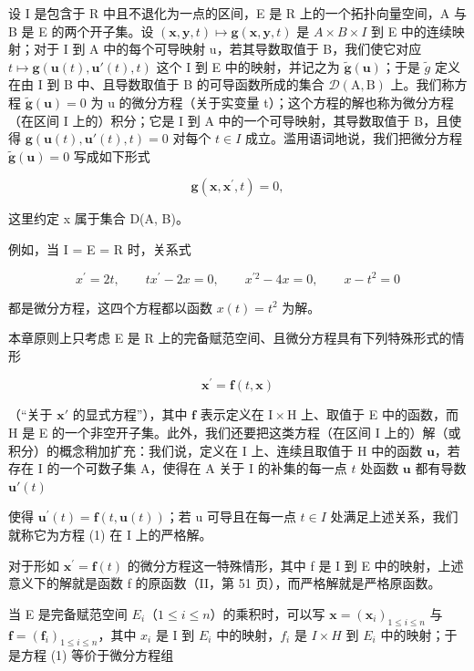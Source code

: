 设 I 是包含于 R 中且不退化为一点的区间，E 是 R 上的一个拓扑向量空间，A 与 B 是 E 的两个开子集。设 \((\mathbf{x}, \mathbf{y}, t) \mapsto \mathbf{g}(\mathbf{x}, \mathbf{y}, t)\) 是 \(A \times B \times I\) 到 E 中的连续映射；对于 I 到 A 中的每个可导映射 u，若其导数取值于 B，我们使它对应 \(t \mapsto \mathbf{g}(\mathbf{u}(t), \mathbf{u}'(t), t)\) 这个 I 到 E 中的映射，并记之为 \(\tilde{\mathbf{g}}(\mathbf{u})\)；于是 \(\tilde{g}\) 定义在由 I 到 B 中、且导数取值于 B 的可导函数所成的集合 \(\mathcal{D}(\mathrm{A}, \mathrm{B})\) 上。我们称方程 \(\tilde{\mathbf{g}}(\mathbf{u}) = 0\) 为 u 的微分方程（关于实变量 t）；这个方程的解也称为微分方程（在区间 I 上的）积分；它是 I 到 A 中的一个可导映射，其导数取值于 B，且使得 \(\mathbf{g}(\mathbf{u}(t), \mathbf{u}'(t), t) = 0\) 对每个 \(t \in I\) 成立。滥用语词地说，我们把微分方程 \(\tilde{\mathbf{g}}(\mathbf{u}) = 0\) 写成如下形式

\[
\mathbf {g} (\mathbf {x}, \mathbf {x} ^ {\prime}, t) = 0,
\]

这里约定 x 属于集合 D(A, B)。

例如，当 I = E = R 时，关系式

\[
x ^ {\prime} = 2 t, \qquad t x ^ {\prime} - 2 x = 0, \qquad x ^ {\prime 2} - 4 x = 0, \qquad x - t ^ {2} = 0
\]

都是微分方程，这四个方程都以函数 \(x(t) = t^{2}\) 为解。

本章原则上只考虑 E 是 R 上的完备赋范空间、且微分方程具有下列特殊形式的情形

\[
\mathbf {x} ^ {\prime} = \mathbf {f} (t, \mathbf {x})\tag{1}
\]

（“关于 \(\mathbf{x}'\) 的显式方程”），其中 \(\mathbf{f}\) 表示定义在 \(\mathrm{I} \times \mathrm{H}\) 上、取值于 E 中的函数，而 H 是 E 的一个非空开子集。此外，我们还要把这类方程（在区间 I 上的）解（或积分）的概念稍加扩充：我们说，定义在 I 上、连续且取值于 H 中的函数 \(\mathbf{u}\)，若存在 I 的一个可数子集 A，使得在 A 关于 I 的补集的每一点 \(t\) 处函数 \(\mathbf{u}\) 都有导数 \(\mathbf{u}'(t)\)

使得 \(\mathbf{u}^{\prime}(t)=\mathbf{f}(t,\mathbf{u}(t))\)；若 u 可导且在每一点 \(t\in I\) 处满足上述关系，我们就称它为方程 (1) 在 I 上的严格解。

对于形如 \(\mathbf{x}^{\prime}=\mathbf{f}(t)\) 的微分方程这一特殊情形，其中 f 是 I 到 E 中的映射，上述意义下的解就是函数 f 的原函数（II，第 51 页），而严格解就是严格原函数。

当 E 是完备赋范空间 \(E_{i}\)（\(1 \leqslant i \leqslant n\)）的乘积时，可以写 \(\mathbf{x} = (\mathbf{x}_{i})_{1 \leqslant i \leqslant n}\) 与 \(\mathbf{f} = (\mathbf{f}_{i})_{1 \leqslant i \leqslant n}\)，其中 \(x_{i}\) 是 I 到 \(E_{i}\) 中的映射，\(f_{i}\) 是 \(I \times H\) 到 \(E_{i}\) 中的映射；于是方程 (1) 等价于微分方程组

